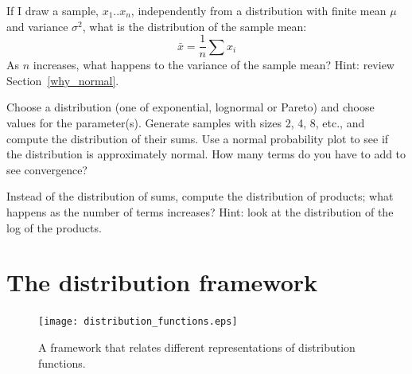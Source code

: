 \documentclass[12pt]{book}
\begin{document}

\begin{ex}

\newcommand{\xbar}{\bar{x}}

If I draw a sample, $x_1 .. x_n$, independently from a
distribution with finite mean $\mu$ and variance $\sigma^2$, what is
the distribution of the sample mean:
%
\[ \xbar = \frac{1}{n} \sum x_i \]
%
As $n$ increases, what happens to the variance of the sample mean?
Hint: review Section~\ref{why_normal}.

\end{ex}

\begin{ex}


Choose a distribution (one of exponential, lognormal or Pareto) and
choose values for the parameter(s).  Generate samples with sizes
2, 4, 8, etc., and compute the distribution of their sums.  Use
a normal probability plot to see if the distribution is approximately
normal.  How many terms do you have to add to see convergence?


\end{ex}


\begin{ex}

Instead of the distribution of sums, compute the distribution of
products; what happens as the number of terms increases?
Hint: look at the distribution of the log of the products.


\end{ex}

\section{The distribution framework}

\begin{figure}
\centerline{\texttt{[image: distribution\_functions.eps]}}
\caption{A framework that relates different representations of distribution
functions.}
\label{dist_framework}
\end{figure}
\end{document}
